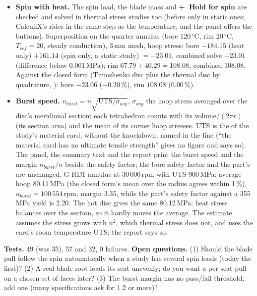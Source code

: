 \begin{itemize}[nosep]
        the pressure times the area equals $N F$, the load follows the speed, the errors and the outward warning.
  \item \textbf{Spin with heat.} The spin load, the blade mass and \textbf{+~Hold for spin} are checked and solved in
        thermal stress studies too (before only in static ones; CalculiX's  rides in the same step as the
        temperature, and the panel offers the buttons). Superposition on the quarter annulus (bore 120\,$^\circ$C, rim
        20\,$^\circ$C, $T_{ref}=20$, steady conduction), 3\,mm mesh, hoop stress: bore $-184.15$ (heat only) $+161.14$
        (spin only, a static study) $=-23.01$, combined solve $-23.01$ (difference below 0.001\,MPa); rim $67.79+40.29=108.08$,
        combined $108.08$. Against the closed form (Timoshenko disc plus the thermal disc by quadrature,
        ): bore $-23.06$ ($-0.20$\,\%), rim $108.08$ ($0.00$\,\%).
  \item \textbf{Burst speed.} $n_{burst}=n\sqrt{\mathrm{UTS}/\sigma_{avg}}$, $\sigma_{avg}$ the hoop stress averaged over the
        disc's meridional section: each tetrahedron counts with its volume$/(2\pi r)$ (its section area) and the mean of
        its corner hoop stresses. UTS is the  of the study's material card, without the
        knockdown, named in the line (``the material card has no ultimate tensile strength'' gives no figure and says so).
        The panel, the summary text and the report print the burst speed and the margin $n_{burst}/n$ beside the safety
        factor; the bore safety factor and the part's are unchanged. G-RD1 annulus at 30\,000\,rpm with UTS 900\,MPa: average
        hoop 80.11\,MPa (the closed form's mean over the radius agrees within 1\,\%), $n_{burst}=100\,554$\,rpm, margin 3.35, while
        the part's safety factor against a 355\,MPa yield is 2.20. The hot disc gives the same 80.12\,MPa: heat stress balances
        over the section, so it hardly moves the average. The estimate assumes the stress grows with $n^2$, which thermal
        stress does not, and uses the card's room temperature UTS; the report says so.
\end{itemize}
\textbf{Tests.}  49 (was 35),  57 and  32, 0
failures. \textbf{Open questions.} (1) Should the blade pull follow the spin automatically when a study has several spin loads
(today the first)? (2) A real blade root loads its seat unevenly; do you want a per-seat pull on a chosen set of faces
later? (3) The burst margin has no pass/fail threshold; add one (many specifications ask for 1.2 or more)?

